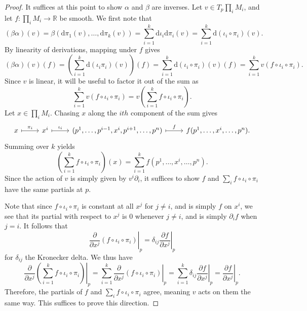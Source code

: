 \documentclass[11pt, letterpaper]{article}
\theoremstyle{plain}
\begin{document}
\begin{proof}
	It suffices at this point to show $\alpha $ and $\beta $ are inverses. Let $v\in T_p \prod_{i} M_i$, and let $f : \prod_{i} M_i \to \mathbb{R} $ be smooth. We first note that
	\[
		(\beta \alpha )(v)=\beta \left( \mathrm{d} \pi _1(v), \ldots ,\mathrm{d} \pi _k(v) \right) =\sum_{i=1}^{k} \mathrm{d} \iota _i\mathrm{d} \pi _i(v)=\sum_{i=1}^{k} \mathrm{d} (\iota _i\circ \pi _i)(v)
	.\]
	By linearity of derivations, mapping under $f$ gives
	\[
		(\beta \alpha )(v)(f)=\left( \sum_{i=1}^{k} \mathrm{d} (\iota _i \pi _i)(v) \right) (f)=\sum_{i=1}^{k} \mathrm{d} (\iota _i\circ \pi _i)(v)(f)=\sum_{i=1}^{k} v(f\circ \iota _i\circ \pi _i)
	.\]
	Since $v$ is linear, it will be useful to factor it out of the sum as
	\[
		\sum_{i=1}^{k} v\left( f\circ \iota _i\circ \pi _i \right) =v\left( \sum_{i=1}^{k} f\circ \iota _i\circ \pi _i \right) 
	.\]
	Let $x\in \prod_{i} M_i$. Chasing $x$ along the $ith$ component of the sum gives
	\[\begin{tikzcd}[row sep = 2.5em, column sep = 2.5em]
		x \ar[" \pi _i ", mapsto,r]  & x^i \ar[" \iota _i ", mapsto, r]  & (p^1, \ldots ,p ^{i-1} ,x^i, p ^{i+1} ,\ldots ,p^n)\ar[" f ", mapsto, r]  & f(p^1, \ldots ,x^i, \ldots ,p^n).
	\end{tikzcd}\]
	Summing over $k$ yields
	\[
		\left( \sum_{i=1}^{k} f\circ \iota _i\circ \pi _i \right) (x)=\sum_{i=1}^{k} f(p^1, \ldots ,x^i, \ldots ,p^n)
	.\]
	Since the action of $v$ is simply given by $v^i \partial _i$, it suffices to show $f$ and $\sum_{i} f\circ \iota _i\circ \pi _i$ have the same partials at $p$.

	Note that since $f\circ \iota _i\circ \pi _i$ is constant at all $x^j$ for $j\neq i$, and is simply $f$ on $x^i$, we see that its partial with respect to $x^j$ is 0 whenever $j\neq i$, and is simply $\partial _i f$ when $j=i$. It follows that
	\[
		\left.\frac{\partial }{\partial x^j} \left( f\circ \iota _i\circ \pi _i \right) \right|_p=\delta_{ij} \left.\frac{\partial f}{\partial x^j} \right|_p	
	\]
	for $\delta _{ij} $ the Kronecker delta. We thus have
	\[
		\left. \frac{\partial }{\partial x^j} \left( \sum_{i=1}^{k} f\circ \iota _i\circ \pi _i \right) \right|_p = \sum_{i=1}^{k} \left.  \frac{\partial }{\partial x^j} (f\circ \iota _i\circ \pi _i)\right|_p= \sum_{i=1}^{k}\left. \delta_{ij}  \frac{\partial f}{\partial x^j}\right|_p=\left. \frac{\partial f}{\partial x^j} \right|_p
	.\]
	Therefore, the partials of $f$ and $\sum_{i} f\circ \iota _i\circ \pi _i$ agree, meaning $v$ acts on them the same way. This suffices to prove this direction.
	

\end{proof}
\end{document}
